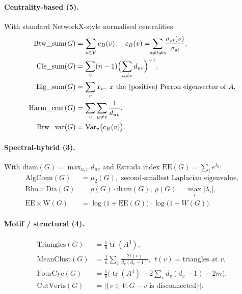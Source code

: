\documentclass[11pt,a4paper]{article}
\begin{document}
\paragraph{Centrality-based (5).}
With standard NetworkX-style normalised centralities:
\begin{align*}
\mathrm{Btw\_sum}(G) &= \sum_{v \in V} c_B(v),\quad c_B(v) = \!\!\sum_{s \ne t \ne v}\!\!
\frac{\sigma_{st}(v)}{\sigma_{st}}, \\
\mathrm{Cls\_sum}(G) &= \sum_{v} (n-1)\Bigl(\sum_{u \ne v} d_{uv}\Bigr)^{-1}, \\
\mathrm{Eig\_sum}(G) &= \sum_{v} x_v,\ x \text{ the (positive) Perron eigenvector of } A, \\
\mathrm{Harm\_cent}(G) &= \sum_{v}\sum_{u \ne v}\frac{1}{d_{uv}}, \\
\mathrm{Btw\_var}(G) &= \mathrm{Var}_v\bigl(c_B(v)\bigr).
\end{align*}

\paragraph{Spectral-hybrid (3).}
With $\mathrm{diam}(G) = \max_{u,v} d_{uv}$ and Estrada index
$\mathrm{EE}(G) = \sum_i e^{\lambda_i}$:
\begin{align*}
\mathrm{AlgConn}(G) &= \mu_2(G), \text{ second-smallest Laplacian eigenvalue}, \\
\mathrm{Rho}\!\times\!\mathrm{Dia}(G) &= \rho(G)\cdot\mathrm{diam}(G),\ \rho(G) = \max_i|\lambda_i|, \\
\mathrm{EE}\!\times\!\mathrm{W}(G) &= \log\bigl(1+\mathrm{EE}(G)\bigr)\cdot\log\bigl(1+W(G)\bigr).
\end{align*}

\paragraph{Motif / structural (4).}
\begin{align*}
\mathrm{Triangles}(G) &= \tfrac{1}{6}\operatorname{tr}(A^3), \\
\mathrm{MeanClust}(G) &= \frac{1}{n}\sum_{v} \frac{2 t(v)}{d_v(d_v-1)},\ \,t(v) = \text{triangles at } v, \\
\mathrm{FourCyc}(G) &= \tfrac{1}{8}\bigl(\operatorname{tr}(A^4) - 2\!\sum_v d_v(d_v - 1) - 2m\bigr), \\
\mathrm{CutVerts}(G) &= |\{v \in V : G - v \text{ is disconnected}\}|.
\end{align*}
\end{document}
